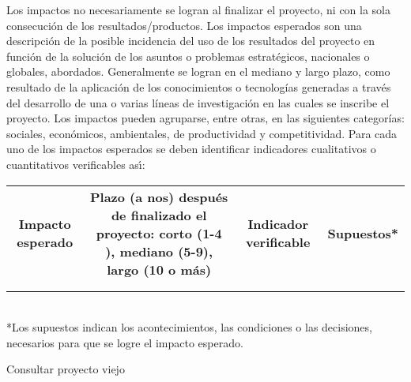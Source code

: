 \begin{ideas}
\begin{instrucciones}
  Los impactos no necesariamente se logran al finalizar el proyecto, ni
con la sola consecución de los resultados/productos. Los impactos
esperados son una descripción de la posible incidencia del uso de los
resultados del proyecto en función de la solución de los asuntos o
problemas estratégicos, nacionales o globales, abordados. Generalmente
se logran en el mediano y largo plazo, como resultado de la aplicación
de los conocimientos o tecnologías generadas a través del desarrollo
de una o varias líneas de investigación en las cuales se inscribe el
proyecto. Los impactos pueden agruparse, entre otras, en las
siguientes categorías: sociales, económicos, ambientales, de
productividad y competitividad. Para cada uno de los impactos
esperados se deben identificar indicadores cualitativos o
cuantitativos verificables as\'\i:
\end{instrucciones}

\begin{tabular}{|c|c|c|c|}\hline
   \textbf{\parbox[t]{2cm}{\textbf{Impacto esperado}}}&\parbox[c]{4cm}{\textbf{Plazo (a nos) después de finalizado el proyecto: corto (1-4 ), mediano (5-9), largo (10 o más)}} & \textbf{\parbox[t]{2cm}{\textbf{Indicador verificable}}} &\textbf{Supuestos*}\\
   & & &\\\hline 
   & & &\\\hline
 \end{tabular}\\
*Los supuestos indican los acontecimientos, las condiciones o las decisiones,
necesarios para que se logre el impacto esperado.


Consultar proyecto viejo




\end{ideas}
